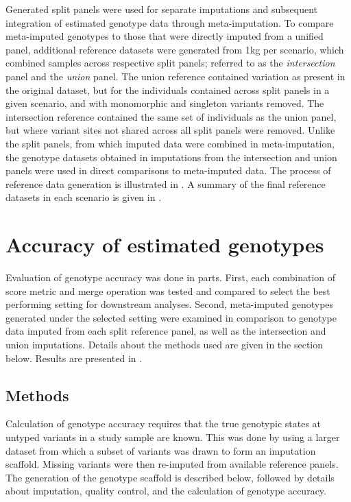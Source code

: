 Generated split panels were used for separate imputations and subsequent integration of estimated genotype data through meta-imputation.
To compare meta-imputed genotypes to those that were directly imputed from a unified panel,  additional reference datasets were generated from \gls{1kg} per scenario, which combined samples across respective split panels; referred to as the \emph{intersection} panel and the \emph{union} panel.
The union reference contained variation as present in the original dataset, but for the individuals contained across split panels in a given scenario, and with monomorphic and singleton variants removed.
The intersection reference contained the same set of individuals as the union panel, but where variant sites not shared across all split panels were removed.
Unlike the split panels, from which imputed data were combined in meta-imputation, the genotype datasets obtained in imputations from the intersection and union panels were used in direct comparisons to meta-imputed data.
The process of reference data generation is illustrated in .
A summary of the final reference datasets in each scenario is given in .

%

%


%
\section{Accuracy of estimated genotypes}
\label{metaimpute_accuracy}
%

Evaluation of genotype accuracy was done in  parts.
First, each combination of score metric and merge operation was tested and compared to select the best performing setting for downstream analyses.
Second, meta-imputed genotypes generated under the selected setting were examined in comparison to genotype data imputed from each split reference panel, as well as the intersection and union imputations.
Details about the methods used are given in the section below.
Results are presented in .



%
\subsection{Methods}
\label{sec:meta_accuracy_methods}
%

Calculation of genotype accuracy requires that the true genotypic states at untyped variants in a study sample are known.
This was done by using a larger dataset from which a subset of variants was drawn to form an imputation scaffold.
Missing variants were then re-imputed from available reference panels.
The generation of the genotype scaffold is described below, followed by details about imputation, quality control, and the calculation of genotype accuracy.


